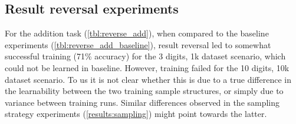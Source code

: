 \begin{table}[!htbp]
	\begin{minipage}[t]{0.47\linewidth}
		\hfill
		\label{tbl:sampling_strategies_sqrt_basic}
	\end{minipage}
	\hfill
	\begin{minipage}[t]{0.47\linewidth}
		\hfill
		\label{tbl:sampling_strategies_sqrt_fromzero}
	\end{minipage}
	
	\vspace{0.5cm}
	\begin{minipage}[t]{0.47\linewidth}
		\hfill
		\label{tbl:sampling_strategies_sqrt_uniformdigits}
	\end{minipage}
	\hfill
	\begin{minipage}[t]{0.47\linewidth}
		\hfill
		\label{tbl:sampling_strategies_sqrt_uniformbits}
	\end{minipage}
\end{table}


\FloatBarrier
\subsection{Result reversal experiments}
\label{results:reversal}


For the addition task (\cref{tbl:reverse_add}), when compared to the baseline experiments (\cref{tbl:reverse_add_baseline}), result reversal led to somewhat successful training (71\% accuracy) for the 3 digits, 1k dataset scenario, which could not be learned in baseline. However, training failed for the 10 digits, 10k dataset scenario.
To us it is not clear whether this is due to a true difference in the learnability between the two training sample structures, or simply due to variance between training runs. Similar differences observed in the sampling strategy experiments (\cref{results:sampling}) might point towards the latter.

